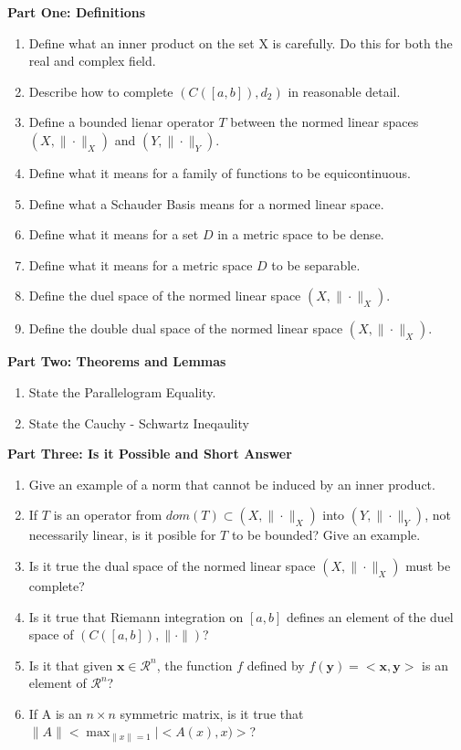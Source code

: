 \documentclass[11pt]{SelfArxOneColBMN}
\affiliation{\textsuperscript{1}\textit{John E. Walker Department of Economics,
Clemson University,Clemson, SC: email ijdavis@g.clemson.edu}}
\date{\small{Version ~\today}}
\begin{document}
\flushbottom

\maketitle

\renewcommand{\theexercise}{\arabic{exercise}}%

\textbf{Part One: Definitions}
\begin{enumerate}
  \item Define what an inner product on the set X is carefully. Do this for both the real and complex field.
  \item Describe how to complete $(C([a,b]),d_2)$ in reasonable detail.
  \item Define a bounded lienar operator $T$ between the normed linear spaces $(X,\|\cdot\|_X)$ and $(Y,\|\cdot\|_Y)$.
  \item Define what it means for a family of functions to be equicontinuous.
  \item Define what a Schauder Basis means for a normed linear space.
  \item Define what it means for a set $D$ in a metric space to be dense.
  \item Define what it means for a metric space $D$ to be separable.
  \item Define the duel space of the normed linear space $(X,\|\cdot\|_X)$.
  \item Define the double dual space of the normed linear space $(X,\|\cdot\|_X)$.
\end{enumerate}

\textbf{Part Two: Theorems and Lemmas}
\begin{enumerate}
  \item State the Parallelogram Equality.
  \item State the Cauchy - Schwartz Ineqaulity
\end{enumerate}

\textbf{Part Three: Is it Possible and Short Answer}
\begin{enumerate}
  \item Give an example of a norm that cannot be induced by an inner product.
  \item If $T$ is an operator from $dom(T) \subset (X,\|\cdot\|_X)$ into $(Y,\|\cdot\|_Y)$, not necessarily linear, is it posible for $T$ to be bounded? Give an example.
  \item Is it true the dual space of the normed linear space $(X,\|\cdot\|_X)$ must be complete?
  \item Is it true that Riemann integration on $[a,b]$ defines an element of the duel space of $(C([a,b]),\|\cdot\|)$?
  \item Is it that given $\mathbf{x} \in \mathcal{R}^n$, the function $f$ defined by $f(\mathbf{y}) = <\mathbf{x},\mathbf{y}>$ is an element of $\mathcal{R}^n$?
  \item If A is an $n \times n$ symmetric matrix, is it true that $\|A\| < \max_{\|x\| = 1}|<A(x),x)>$?
\end{enumerate}
\end{document}
